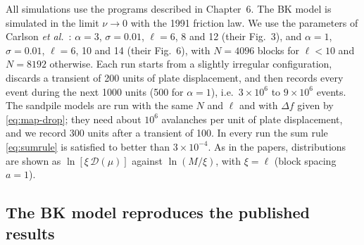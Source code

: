 All simulations use the programs described in Chapter~6. The BK model is simulated in the limit $\nu\to0$ with the 1991 friction law. We use
the parameters of Carlson \emph{et al.}~\cite{Carlson1991}: $\alpha=3$, $\sigma=0.01$, $\ell = 6$, 8 and 12 (their Fig.~3), and $\alpha=1$,
$\sigma=0.01$, $\ell=6$, 10 and 14 (their Fig.~6), with $N=4096$ blocks for $\ell<10$ and $N=8192$ otherwise. Each run starts from a
slightly irregular configuration, discards a transient of 200 units of plate displacement, and then records every event during the next 1000
units (500 for $\alpha=1$), i.e.\ $3\times10^6$ to $9\times10^6$ events. The sandpile models are run with the same $N$ and $\ell$ and with
$\Delta f$ given by \cref{eq:map-drop}; they need about $10^6$ avalanches per unit of plate displacement, and we record 300 units after a
transient of 100. In every run the sum rule \cref{eq:sumrule} is satisfied to better than $3\times10^{-4}$. As in the papers, distributions are
shown as $\ln[\xi\,\mathcal D(\mu)]$ against $\ln(M/\xi)$, with $\xi=\ell$ (block spacing $a=1$).

\subsection{The BK model reproduces the published results}

